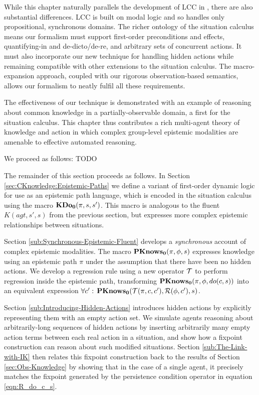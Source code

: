 While this chapter naturally parallels the development of LCC in \citep{vanBenthem06lcc},
there are also substantial differences. LCC is built on modal logic
and so handles only propositional, synchronous domains. The richer
ontology of the situation calculus means our formalism must support
first-order preconditions and effects, quantifying-in and de-dicto/de-re,
and arbitrary sets of concurrent actions. It must also incorporate
our new technique for handling hidden actions while remaining compatible
with other extensions to the situation calculus. The macro-expansion
approach, coupled with our rigorous observation-based semantics, allows
our formalism to neatly fulfil all these requirements.

The effectiveness of our technique is demonstrated with an example
of reasoning about common knowledge in a partially-observable domain,
a first for the situation calculus. This chapter thus contributes
a rich multi-agent theory of knowledge and action in which complex
group-level epistemic modalities are amenable to effective automated
reasoning.

We proceed as follows: TODO

The remainder of this section proceeds as follows. In Section \ref{sec:CKnowledge:Epistemic-Paths}
we define a variant of first-order dynamic logic for use as an epistemic
path language, which is encoded in the situation calculus using the
macro $\mathbf{KDo_{0}}(\pi,s,s')$. This macro is analogous to the fluent $K(agt,s',s)$
from the previous section, but expresses more complex epistemic relationships
between situations.

Section \ref{sub:Synchronous-Epistemic-Fluent} develops a \emph{synchronous}
account of complex epistemic modalities. The macro $\mathbf{PKnows_{0}}(\pi,\phi,s)$
expresses knowledge using an epistemic path $\pi$ under the assumption
that there have been no hidden actions. We develop a regression rule
using a new operator $\mathcal{T}$ to perform regression inside the epistemic
path, transforming $\mathbf{PKnows_{0}}(\pi,\phi,do(c,s))$ into an equivalent
expression $\forall c':\,\mathbf{PKnows_{0}}(\mathcal{T}(\pi,c,c'),\mathcal{R}(\phi,c'),s)$.

Section \ref{sub:Introducing-Hidden-Actions} introduces hidden actions
by explicitly representing them with an empty action set. We simulate
agents reasoning about arbitrarily-long sequences of hidden actions
by inserting arbitrarily many empty action terms between each real
action in a situation, and show how a fixpoint construction can reason
about such modified situations. Section \ref{sub:The-Link-with-IK}
then relates this fixpoint construction back to the results of Section
\ref{sec:Obs-Knowledge} by showing that in the case of a single agent,
it precisely matches the fixpoint generated by the persistence condition
operator in equation \eqref{eqn:R_do_c_s}.

